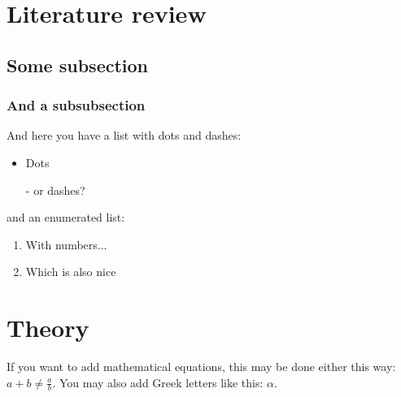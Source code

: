 \documentclass[11pt, letterpaper]{article} %
\begin{document}

\section{Literature review}

\blindtext %

\subsection{Some subsection}
\blindtext %

\subsubsection{And a subsubsection}
\blindtext %

And here you have a list with dots and dashes:
\begin{itemize}
    \item Dots
    \item[-] or dashes?
\end{itemize}

and an enumerated list:

\begin{enumerate}
    \item With numbers...
    \item Which is also nice \Winkey
\end{enumerate}


\section{Theory}

If you want to add mathematical equations, this may be done either this way: $a +  b \neq \frac{a}{b}$. You may also add Greek letters like this: $\alpha$.\\

\blindtext %
\end{document}
